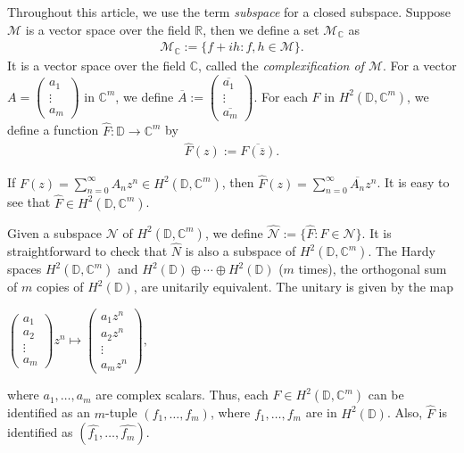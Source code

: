 \documentclass[11pt]{amsart}
\numberwithin{equation}{section}
\begin{document}
Throughout this article, we use the term \textit{subspace }for a closed subspace. Suppose $\mathcal{M}$ is a vector space over the field $\mathbb{R}$, then we define a set $\mathcal{M}_\mathbb{C}$ as
\begin{eqnarray*}
 \mathcal{M}_\mathbb{C}:=\big\{f + ih : f,h \in \mathcal{M}\big\}.  
\end{eqnarray*}
 It is a vector space over the field $\mathbb{C}$, called the \textit{complexification of $\mathcal{M}$}. For a vector $A=\begin{pmatrix} a_1 \\ \vdots \\ a_m\end{pmatrix}$ in $\mathbb{C}^m$, we define $\overline{A}:=\begin{pmatrix} \overline{a_1} \\ \vdots \\ \overline{a_m}\end{pmatrix}$.
  For each $F$ in $H^2(\mathbb{D},\mathbb{C}^m)$, we define a function $\widehat{F}: \mathbb{D} \longrightarrow \mathbb{C}^m$ by
\begin{eqnarray*}
    \widehat{F} (z):=\overline{F(\overline{z})}.
\end{eqnarray*}

If $F(z)=\sum_{n=0}^{\infty}A_nz^n \in H^2(\mathbb{D},\mathbb{C}^m)$, then
$
\widehat{F}(z)=\sum_{n=0}^{\infty}\overline{A_n}z^n$. It is easy to see that $\widehat{F} \in H^2(\mathbb{D},\mathbb{C}^m)$.

Given a subspace $\mathcal{N}$ of $H^2(\mathbb{D},\mathbb{C}^m)$, we define $\widehat{\mathcal{N}}:=\{\widehat{F} : F \in \mathcal{N}\}$. It is straightforward to check that $\widehat{N}$ is also a subspace of $H^2(\mathbb{D},\mathbb{C}^m)$. The Hardy spaces $H^2(\mathbb{D}, \mathbb{C}^{m})$ and $H^2(\mathbb{D}) \oplus \cdots \oplus H^2(\mathbb{D})$ ($m$ times), the orthogonal sum of $m$ copies of $H^2(\mathbb{D})$, are unitarily equivalent. The unitary is given by the map 
\begin{center}
    

$\begin{pmatrix}
a_1 \\ 
a_2\\ 
\vdots \\
a_m
\end{pmatrix}z^n
\mapsto 
\begin{pmatrix}
 a_1 z^n\\ 
a_2 z^n\\
\vdots \\
a_m z^n
\end{pmatrix},$
\end{center}
where $a_1, \dots , a_m$ are complex scalars.
Thus, each $F\in H^2(\mathbb{D},\mathbb{C}^m)$ can be identified as an $m$-tuple $(f_1, \dots , f_m)$, where $f_1, \dots , f_m$ are in $H^2(\mathbb{D})$. Also, $\widehat{F}$ is identified as $(\widehat{f_1}, \dots , \widehat{f_m})$.
\end{document}

